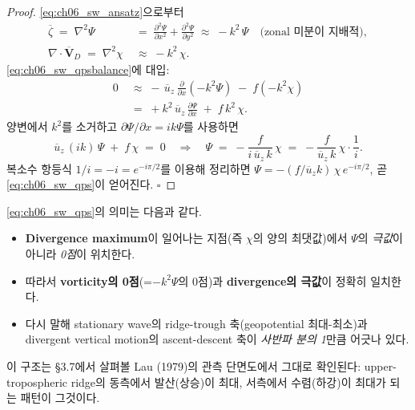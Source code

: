 \begin{proof}
\eqref{eq:ch06_sw_ansatz}으로부터
\begin{align}
  \overline{\zeta} \;=\; \nabla^2 \Psi
     &\;=\; \frac{\partial^2 \Psi}{\partial x^2} + \frac{\partial^2 \Psi}{\partial y^2}
     \;\approx\; -k^2\,\Psi
     \quad\text{(zonal 미분이 지배적)},
     \label{eq:ch06_sw_zetapsi}\\[2pt]
  \nabla\!\cdot\!\overline{\mathbf{V}}_D \;=\; \nabla^2\chi &\;\approx\; -k^2\,\chi .
  \label{eq:ch06_sw_divchi}
\end{align}
\eqref{eq:ch06_sw_qpsbalance}에 대입:
\begin{align}
  0 &\;\approx\; -\,\overline{u}_z\,\frac{\partial}{\partial x}(-k^2 \Psi)
              \;-\; f(-k^2 \chi)\\
    &\;=\; +k^2\,\overline{u}_z\,\frac{\partial \Psi}{\partial x}
        \;+\; f\,k^2\,\chi.
\end{align}
양변에서 $k^2$를 소거하고 $\partial\Psi/\partial x = i k \Psi$를 사용하면
\begin{equation}\label{eq:ch06_sw_proofkey}
  \overline{u}_z\,(i k)\,\Psi \;+\; f\,\chi \;=\; 0
  \quad\Longrightarrow\quad
  \Psi \;=\; -\frac{f}{i\,\overline{u}_z\,k}\,\chi
       \;=\; -\frac{f}{\overline{u}_z\,k}\,\chi \cdot \frac{1}{i} .
\end{equation}
복소수 항등식 $1/i = -i = e^{-i\pi/2}$를 이용해 정리하면
$\Psi = -(f/\overline{u}_z k)\,\chi\,e^{-i\pi/2}$, 곧 \eqref{eq:ch06_sw_qps}이 얻어진다.
$\square$
\end{proof}

\begin{remark}\label{rem:ch06_sw_qpsphys}
\eqref{eq:ch06_sw_qps}의 의미는 다음과 같다.
\begin{itemize}
  \item \textbf{Divergence maximum}이 일어나는 지점(즉 $\chi$의 양의 최댓값)에서
        $\Psi$의 \emph{극값}이 아니라 \emph{0점}이 위치한다.
  \item 따라서 \textbf{vorticity의 0점}(=$-k^2\Psi$의 0점)과 \textbf{divergence의 극값}이 정확히 일치한다.
  \item 다시 말해 stationary wave의 ridge-trough 축(geopotential 최대-최소)과
        divergent vertical motion의 ascent-descent 축이 \emph{사반파 분의 1}만큼 어긋나 있다.
\end{itemize}
이 구조는 §3.7에서 살펴볼 Lau (1979)의 관측 단면도에서 그대로 확인된다:
upper-tropospheric ridge의 동측에서 발산(상승)이 최대,
서측에서 수렴(하강)이 최대가 되는 패턴이 그것이다.
\end{remark}

